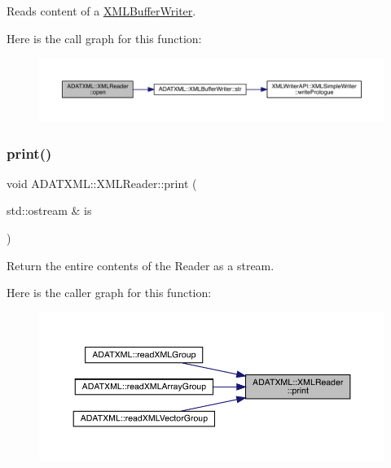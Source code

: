 Reads content of a \mbox{\hyperlink{classADATXML_1_1XMLBufferWriter}{X\+M\+L\+Buffer\+Writer}}. 

Here is the call graph for this function\+:
\nopagebreak
\begin{figure}[H]
\begin{center}
\leavevmode
\includegraphics[width=350pt]{db/d3f/classADATXML_1_1XMLReader_a38615b0ae22722bd15a47e27953dc77c_cgraph}
\end{center}
\end{figure}
\mbox{\label{classADATXML_1_1XMLReader_a72513fe6f299e02428bdf4d225163f50}} 
\subsubsection{\texorpdfstring{print()}{print()}\hspace{0.1cm}{\footnotesize\ttfamily [1/2]}}
{\footnotesize\ttfamily void A\+D\+A\+T\+X\+M\+L\+::\+X\+M\+L\+Reader\+::print (\begin{DoxyParamCaption}\item[{std\+::ostream \&}]{is }\end{DoxyParamCaption})}



Return the entire contents of the Reader as a stream. 

Here is the caller graph for this function\+:
\nopagebreak
\begin{figure}[H]
\begin{center}
\leavevmode
\includegraphics[width=350pt]{db/d3f/classADATXML_1_1XMLReader_a72513fe6f299e02428bdf4d225163f50_icgraph}
\end{center}
\end{figure}
\mbox{\label{classADATXML_1_1XMLReader_a72513fe6f299e02428bdf4d225163f50}} 
